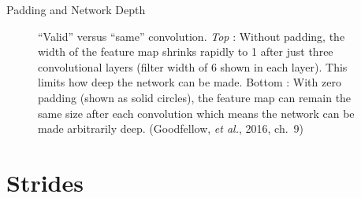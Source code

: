 \begin{frame}{Padding and Network Depth}
\begin{figure}
\center
{}
\caption{\small{\enquote{Valid} versus \enquote{same} convolution. \emph{Top} : Without padding, the width of the feature map shrinks rapidly to 1 after just three convolutional layers (filter width of 6 shown in each layer). This limits how deep the network can be made. {Bottom} : With zero padding (shown as solid circles), the feature map can remain the same size after each convolution which means the network can be made arbitrarily deep. (Goodfellow, \emph{et al.}, 2016, ch.~9)}}
\end{figure}
\end{frame}
\section{Strides}

